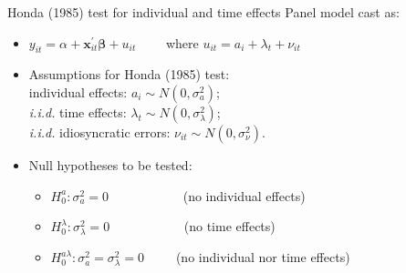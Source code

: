 \documentclass[usenames,dvipsnames]{beamer}
\begin{document}
\begin{frame}{Honda (1985) test for individual and time effects}
Panel model cast as: \\ \bigskip
\begin{itemize}
    \item $y_{it} = \alpha + \bm{x}^{\prime}_{it} \bm{\beta} + u_{it} \qquad$    where $u_{it}=a_i + \lambda_t + \nu_{it}$
    \bigskip
    \item Assumptions for Honda (1985) test: \\  individual effects: $a_i \sim N(0,\sigma^2_{a})$; \\{\it i.i.d.} time effects: $\lambda_t \sim N(0,\sigma^2_{\lambda})$; \\{\it i.i.d.} idiosyncratic errors: $\nu_{it} \sim N(0,\sigma^2_{\nu})$.
    \bigskip
    \item Null hypotheses to be tested:
    \medskip
    \begin{itemize}
        \item $H_0^{a}: \sigma^2_{a} = 0 \qquad \qquad$ ~~~(no individual effects)
        \smallskip
        \item $H_0^{\lambda}: \sigma^2_{\lambda} = 0 \qquad \qquad$ ~~~(no time effects)
        \smallskip
        \item $H_0^{a \lambda}: \sigma^2_{a} = \sigma^2_{\lambda} = 0 \qquad \,$ (no individual nor time effects)
    \end{itemize}
\end{itemize}
\end{frame}
\end{document}
